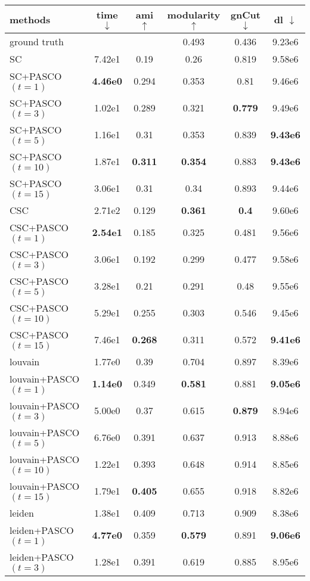 \begin{tabular}{lccccc}
\toprule
methods & time $\downarrow$ & ami $\uparrow$ & modularity $\uparrow$ & gnCut $\downarrow$ & dl $\downarrow$ \\
\midrule
ground truth &  &  & 0.493 & 0.436 & 9.23e6 \\
\midrule
SC & 7.42e1 & 0.19 & 0.26 & 0.819 & 9.58e6 \\
SC+PASCO $(t=1)$ & \textbf{4.46e0} & 0.294 & 0.353 & 0.81 & 9.46e6 \\
SC+PASCO $(t=3)$ & 1.02e1 & 0.289 & 0.321 & \textbf{0.779} & 9.49e6 \\
SC+PASCO $(t=5)$ & 1.16e1 & 0.31 & 0.353 & 0.839 & \textbf{9.43e6} \\
SC+PASCO $(t=10)$ & 1.87e1 & \textbf{0.311} & \textbf{0.354} & 0.883 & \textbf{9.43e6} \\
SC+PASCO $(t=15)$ & 3.06e1 & 0.31 & 0.34 & 0.893 & 9.44e6 \\
\midrule
CSC & 2.71e2 & 0.129 & \textbf{0.361} & \textbf{ 0.4} & 9.60e6 \\
CSC+PASCO $(t=1)$ & \textbf{2.54e1} & 0.185 & 0.325 & 0.481 & 9.56e6 \\
CSC+PASCO $(t=3)$ & 3.06e1 & 0.192 & 0.299 & 0.477 & 9.58e6 \\
CSC+PASCO $(t=5)$ & 3.28e1 & 0.21 & 0.291 & 0.48 & 9.55e6 \\
CSC+PASCO $(t=10)$ & 5.29e1 & 0.255 & 0.303 & 0.546 & 9.45e6 \\
CSC+PASCO $(t=15)$ & 7.46e1 & \textbf{0.268} & 0.311 & 0.572 & \textbf{9.41e6} \\
\midrule
louvain & 1.77e0 & 0.39 & 0.704 & 0.897 & 8.39e6 \\
louvain+PASCO $(t=1)$ & \textbf{1.14e0} & 0.349 & \textbf{0.581} & 0.881 & \textbf{9.05e6} \\
louvain+PASCO $(t=3)$ & 5.00e0 & 0.37 & 0.615 & \textbf{0.879} & 8.94e6 \\
louvain+PASCO $(t=5)$ & 6.76e0 & 0.391 & 0.637 & 0.913 & 8.88e6 \\
louvain+PASCO $(t=10)$ & 1.22e1 & 0.393 & 0.648 & 0.914 & 8.85e6 \\
louvain+PASCO $(t=15)$ & 1.79e1 & \textbf{0.405} & 0.655 & 0.918 & 8.82e6 \\
\midrule
leiden & 1.38e1 & 0.409 & 0.713 & 0.909 & 8.38e6 \\
leiden+PASCO $(t=1)$ & \textbf{4.77e0} & 0.359 & \textbf{0.579} & 0.891 & \textbf{9.06e6} \\
leiden+PASCO $(t=3)$ & 1.28e1 & 0.391 & 0.619 & 0.885 & 8.95e6 \\

\end{tabular}
